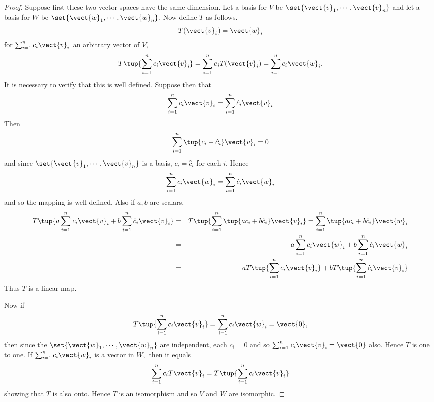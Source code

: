 \begin{proof}Suppose first these two vector spaces have the same
dimension. Let a basis for $V$ be $\set{
\vect{v}_{1},\cdots ,\vect{v}_{n}} $ and let a basis for $W$ be $
\set{\vect{w}_{1},\cdots ,\vect{w}_{n}} $. Now define $T$ as
follows. 
\begin{equation*}
T(\vect{v}_{i})=\vect{w}_{i}
\end{equation*}
for $\sum_{i=1}^{n}c_{i}\vect{v}_{i}$ an arbitrary vector of $V,$%
\begin{equation*}
T\tup{\sum_{i=1}^{n}c_{i}\vect{v}_{i}} = \sum_{i=1}^{n}c_{i}T
(\vect{v}_{i})=\sum_{i=1}^{n}c_{i}\vect{w}_{i}.
\end{equation*}
It is necessary to verify that this is well defined. Suppose then that 
\begin{equation*}
\sum_{i=1}^{n}c_{i}\vect{v}_{i}=\sum_{i=1}^{n}\hat{c}_{i}\vect{v}_{i}
\end{equation*}
Then 
\begin{equation*}
\sum_{i=1}^{n}\tup{c_{i}-\hat{c}_{i}} \vect{v}_{i}=0
\end{equation*}
and since $\set{\vect{v}_{1},\cdots ,\vect{v}_{n}} $ is a basis, $
c_{i}=\hat{c}_{i}$ for each $i$. Hence 
\begin{equation*}
\sum_{i=1}^{n}c_{i}\vect{w}_{i}=\sum_{i=1}^{n}\hat{c}_{i}\vect{w}_{i}
\end{equation*}
and so the mapping is well defined. Also if $a,b$ are scalars, 
\begin{eqnarray*}
T\tup{a\sum_{i=1}^{n}c_{i}\vect{v}_{i}+b\sum_{i=1}^{n}\hat{c}_{i}\vect{v}
_{i}} &=&T\tup{\sum_{i=1}^{n}\tup{ac_{i}+b\hat{c}_{i}} \vect{v
}_{i}} =\sum_{i=1}^{n}\tup{ac_{i}+b\hat{c}_{i}} \vect{w}_{i} \\
&=&a\sum_{i=1}^{n}c_{i}\vect{w}_{i}+b\sum_{i=1}^{n}\hat{c}_{i}\vect{w}_{i} \\
&=&aT\tup{\sum_{i=1}^{n}c_{i}\vect{v}_{i}} +bT\tup{\sum_{i=1}^{n}
\hat{c}_{i}\vect{v}_{i}}
\end{eqnarray*}
Thus $T$ is a linear map.

Now if 
\begin{equation*}
T\tup{\sum_{i=1}^{n}c_{i}\vect{v}_{i}} =\sum_{i=1}^{n}c_{i}\vect{w}
_{i}=\vect{0},
\end{equation*}
then since the $\set{\vect{w}_{1},\cdots ,\vect{w}_{n}} $ are
independent, each $c_{i}=0$ and so $\sum_{i=1}^{n}c_{i}\vect{v}_{i}=\vect{0}$
also. Hence $T$ is one to one. If $\sum_{i=1}^{n}c_{i}\vect{w}_{i}$ is a
vector in $W,$ then it equals 
\begin{equation*}
\sum_{i=1}^{n}c_{i}T\vect{v}_{i}=T\tup{\sum_{i=1}^{n}c_{i}\vect{v}_{i}}
\end{equation*}
showing that $T$ is also onto. Hence $T$ is an isomorphism and so $V$ and $W$
are isomorphic.


\end{proof}
